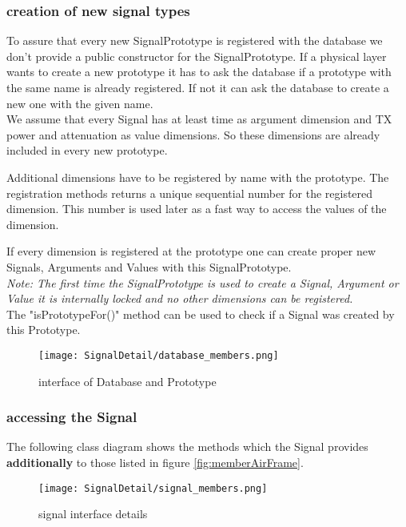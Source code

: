 \newpage
\subsubsection{creation of new signal types}

To assure that every new SignalPrototype is registered with the database we
don't provide a public constructor for the SignalPrototype. If a physical layer
wants to create a new prototype it has to ask the database if a prototype with
the same name is already registered. If not it can ask the database to create a
new one with the given name.\\

We assume that every Signal has at least time as argument dimension and TX 
power and attenuation as value dimensions. So these dimensions are already
included in every new prototype.

Additional dimensions have to be registered by name with the prototype. The 
registration methods returns a unique sequential number for the registered
dimension. This number is used later as a fast way to access the values of the
dimension.

If every dimension is registered at the prototype one can create proper new 
Signals, Arguments and Values with this SignalPrototype.\\

\emph{Note: The first time the SignalPrototype is used to create a Signal, 
Argument or Value it is internally locked and no other dimensions can be
registered.}\\

The "isPrototypeFor()" method can be used to check if a Signal was created by 
this Prototype.

\begin{figure}[H]
 \centering
 \texttt{[image: SignalDetail/database\_members.png]}
 \caption{interface of Database and Prototype}
 \label{fig: Database members}
\end{figure}
\newpage
\subsubsection{accessing the Signal}

The following class diagram shows the methods which the Signal provides
\textbf{additionally} to those listed in figure \ref{fig:memberAirFrame}.

\begin{figure}[H]
 \centering
 \texttt{[image: SignalDetail/signal\_members.png]}
 \caption{signal interface details}
 \label{fig: detailed signal members}
\end{figure}

